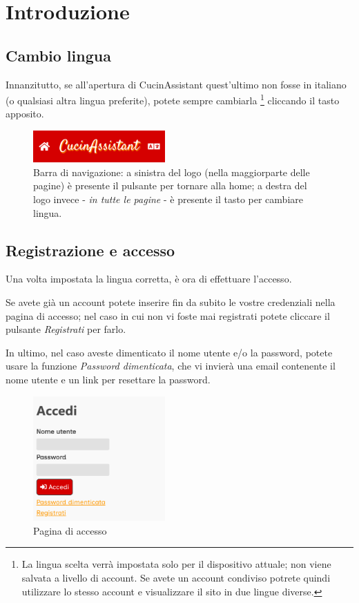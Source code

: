 \documentclass[12pt, a4paper]{report}
\begin{document}
    \chapter{Introduzione}

    \section{Cambio lingua} \label{changelang}

    Innanzitutto, se all'apertura di CucinAssistant quest'ultimo non fosse in italiano (o qualsiasi altra lingua preferite), potete sempre cambiarla
    \footnote{La lingua scelta verrà impostata solo per il dispositivo attuale; non viene salvata a livello di account. Se avete un account condiviso
    potrete quindi utilizzare lo stesso account e visualizzare il sito in due lingue diverse.} cliccando il tasto apposito.

    \begin{figure}[H]
        \centering
        \includegraphics[width=0.45\textwidth]{assets/nav.png}
        \caption{Barra di navigazione: a sinistra del logo (nella maggiorparte delle pagine) è presente il pulsante per tornare alla home; a destra
        del logo invece - \emph{in tutte le pagine} - è presente il tasto per cambiare lingua.}
    \end{figure}

    \section{Registrazione e accesso}

    Una volta impostata la lingua corretta, è ora di effettuare l'accesso.
    
    Se avete già un account potete inserire fin da subito le vostre credenziali nella pagina di accesso; nel caso in cui non vi foste mai registrati
    potete cliccare il pulsante \emph{Registrati} per farlo.

    In ultimo, nel caso aveste dimenticato il nome utente e/o la password, potete usare la funzione \emph{Password dimenticata}, che vi invierà una
    email contenente il nome utente e un link per resettare la password.

    \begin{figure}[H]
        \centering
        \includegraphics[width=0.45\textwidth]{assets/it/signin.png}
        \caption{Pagina di accesso}
    \end{figure}
\end{document}

